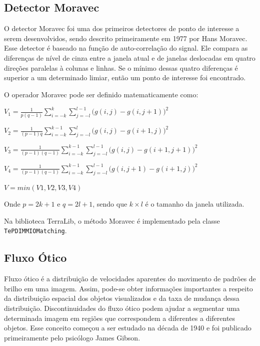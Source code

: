 \documentclass[9pt, a4paper, nofonttune, journal]{IEEEtran}
\begin{document}
\subsection{Detector Moravec}
O detector Moravec foi uma dos primeiros detectores de ponto de interesse a serem desenvolvidos, sendo descrito primeiramente 
em 1977 por Hans Moravec\cite{Moravec1}.
Esse detector é baseado na função de auto-correlação do signal. Ele compara as diferenças de nível de cinza entre a janela atual e de janelas 
deslocadas em quatro direções paralelas à colunas e linhas. Se o mínimo dessas quatro diferenças é superior a um determinado limiar, então um ponto de interesse
foi encontrado.\cite{Coderlia1}
  
O operador Moravec pode ser definido matematicamente como:
    \begin{center}$V_{1}=\frac{1}{p(q-1)}\sum_{i=-k}^k\sum_{j=-l}^{l-1}\bigl(g(i,j)-g(i,j+1)\bigr)^2$    \end{center}
    \begin{center}$V_{2}=\frac{1}{(p-1)q}\sum_{i=-k}^{k-1}\sum_{j=-l}^l\bigl(g(i,j)-g(i+1,j)\bigr)^2$    \end{center}
    \begin{center}$V_{3}=\frac{1}{(p-1)(q-1)}\sum_{i=-k}^{k-1}\sum_{j=-l}^{l-1}\bigl(g(i,j)-g(i+1,j+1)\bigr)^2$\end{center}
    \begin{center}$V_{4}=\frac{1}{(p-1)(q-1)}\sum_{i=-k}^{k-1}\sum_{j=-l}^{l-1}\bigl(g(i,j+1)-g(i+1,j)\bigr)^2$\end{center}
    \begin{center}$V = min(V1,V2,V3,V4)$\end{center}

    Onde $p = 2k + 1$ e $q = 2l + 1$, sendo que $k\times l$ é o tamanho da janela utilizada. 

Na biblioteca TerraLib, o método Moravec é implementado pela classe \texttt{TePDIMMIOMatching}.
\subsection{Fluxo Ótico}
Fluxo ótico é a distribuição de velocidades aparentes do movimento de padrões de brilho em uma imagem.\cite{GibsonBook1} Assim, pode-se obter informações importantes a respeito da distribuição espacial dos objetos visualizados 
e da taxa de mudança dessa distribuição. Discontinuidades do fluxo ótico podem ajudar a segmentar uma determinada imagem 
em regiões que correspondem a diferentes a diferentes objetos.
Esse conceito começou a ser estudado na década de 1940 e foi publicado primeiramente pelo psicólogo James Gibson. \cite{Gibson1} \cite{OF1}
\end{document}
